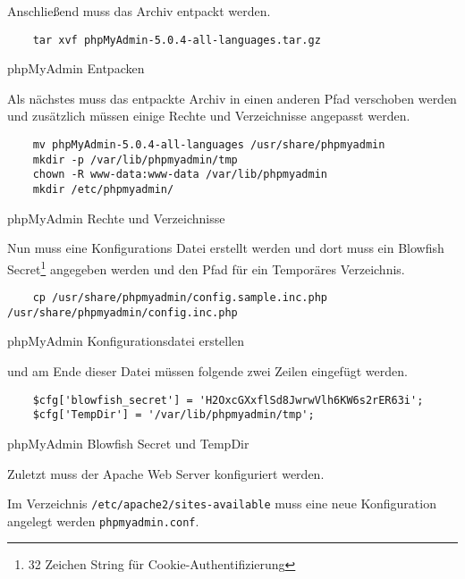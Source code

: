 Anschließend muss das Archiv entpackt werden.

\begin{listing}[H]
  \begin{verbatim}
    tar xvf phpMyAdmin-5.0.4-all-languages.tar.gz
  \end{verbatim}
  \caption{phpMyAdmin Entpacken}
\end{listing}

Als nächstes muss das entpackte Archiv in einen anderen Pfad verschoben werden
und zusätzlich müssen einige Rechte und Verzeichnisse angepasst werden.

\begin{listing}[H]
  \begin{verbatim}
    mv phpMyAdmin-5.0.4-all-languages /usr/share/phpmyadmin
    mkdir -p /var/lib/phpmyadmin/tmp
    chown -R www-data:www-data /var/lib/phpmyadmin
    mkdir /etc/phpmyadmin/
  \end{verbatim}
  \caption{phpMyAdmin Rechte und Verzeichnisse}
\end{listing}

Nun muss eine Konfigurations Datei erstellt werden und dort muss ein Blowfish
Secret\footnote{32 Zeichen String für Cookie-Authentifizierung} angegeben werden
und den Pfad für ein Temporäres Verzeichnis.

\begin{listing}[H]
  \begin{verbatim}
    cp /usr/share/phpmyadmin/config.sample.inc.php /usr/share/phpmyadmin/config.inc.php
  \end{verbatim}
  \caption{phpMyAdmin Konfigurationsdatei erstellen}
\end{listing}

und am Ende dieser Datei müssen folgende zwei Zeilen eingefügt werden.

\begin{listing}[H]
  \begin{verbatim}
    $cfg['blowfish_secret'] = 'H2OxcGXxflSd8JwrwVlh6KW6s2rER63i'; 
    $cfg['TempDir'] = '/var/lib/phpmyadmin/tmp';
  \end{verbatim}
  \caption{phpMyAdmin Blowfish Secret und TempDir}
\end{listing}

Zuletzt muss der Apache Web Server konfiguriert werden.

Im Verzeichnis \verb|/etc/apache2/sites-available| muss eine neue Konfiguration
angelegt werden \verb|phpmyadmin.conf|.

